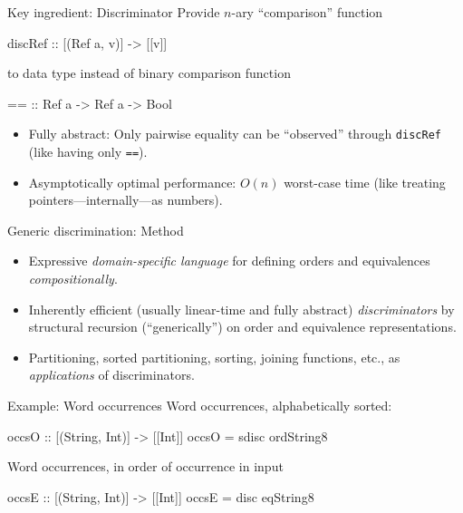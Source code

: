\documentclass{beamer}
\begin{document}
\begin{frame}[fragile]{Key ingredient: Discriminator}
  Provide $n$-ary ``comparison'' function
\begin{haskell}
discRef :: [(Ref a, v)] -> [[v]]
\end{haskell}
  to data type instead of binary comparison function
\begin{haskell}
== :: Ref a -> Ref a -> Bool
\end{haskell}
  \begin{itemize}
  \item Fully abstract: Only pairwise equality can be ``observed'' through
    \lstinline|discRef| (like having only \lstinline|==|).
  \item Asymptotically optimal performance: $O(n)$ worst-case time (like
    treating pointers---internally---as numbers).
  \end{itemize}
\end{frame}

\begin{frame}{Generic discrimination: Method}
  \begin{itemize}
  \item Expressive \emph{domain-specific language} for defining orders and
    equivalences \emph{compositionally}.
  \item Inherently efficient (usually linear-time and fully abstract)
    \emph{discriminators} by structural recursion (``generically'') on order
    and equivalence representations.
  \item Partitioning, sorted partitioning, sorting, joining functions, etc.,
    as \emph{applications} of discriminators.
  \end{itemize}
\end{frame}

\begin{frame}[fragile]{Example: Word occurrences}
  Word occurrences, alphabetically sorted:
\begin{haskell}
occsO :: [(String, Int)] -> [[Int]]
occsO = sdisc ordString8
\end{haskell}
  Word occurrences, in order of occurrence in input
\begin{haskell}
occsE :: [(String, Int)] -> [[Int]]
occsE = disc eqString8
\end{haskell}
\end{frame}
\end{document}
